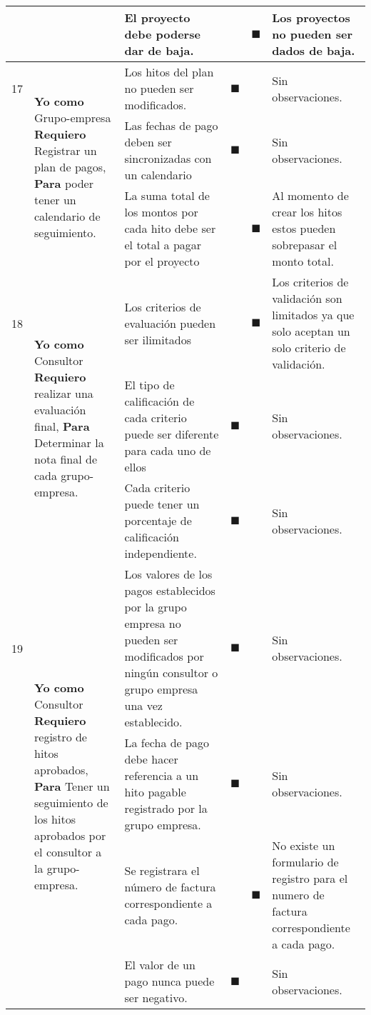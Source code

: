 \documentclass[letterpaper,11pt]{article}
\begin{document}
\begin{landscape}
\begin{tabular}{|c|p{5cm}|p{7.5cm}|c|c|p{7.5cm}|}
			& & El proyecto debe poderse dar de baja. & & $\blacksquare$ & Los proyectos no pueden ser dados de baja. \\ \hline
			17 & \multirow{3}{5cm}{\textbf{Yo como} Grupo-empresa \textbf{Requiero} Registrar un plan de pagos, \textbf{Para} poder tener un calendario de seguimiento.} & Los hitos del plan no pueden ser modificados. & $\blacksquare$ & & Sin observaciones. \\ \cline{3-6}
			& & Las fechas de pago deben ser sincronizadas con un calendario & $\blacksquare$ & & Sin observaciones. \\ \cline{3-6}
			& & La suma total de los montos por cada hito debe ser el total a pagar por el proyecto & & $\blacksquare$ & Al momento de crear los hitos estos pueden sobrepasar el monto total. \\ \hline
			18 & \multirow{3}{5cm}{\textbf{Yo como} Consultor \textbf{Requiero} realizar una evaluación final, \textbf{Para} Determinar la nota final de cada grupo-empresa.} & Los criterios de evaluación pueden ser ilimitados & & $\blacksquare$ & Los criterios de validación son limitados ya que solo aceptan un solo criterio de validación. \\ \cline{3-6}
			& & El tipo de calificación de cada criterio puede ser diferente para cada uno de ellos & $\blacksquare$ & & Sin observaciones. \\ \cline{3-6} 
			& & Cada criterio puede tener un porcentaje de calificación independiente. & $\blacksquare$ & & Sin observaciones. \\ \hline
			19 & \multirow{4}{5cm}{\textbf{Yo como} Consultor \textbf{Requiero} registro de hitos aprobados, \textbf{Para} Tener un seguimiento de los hitos aprobados por el consultor a la grupo-empresa.} & Los valores de los pagos establecidos por la grupo empresa no pueden ser modificados por ningún consultor o grupo empresa una vez establecido. & $\blacksquare$ & & Sin observaciones. \\ \cline{3-6} 
			& & La fecha de pago debe hacer referencia a un hito pagable registrado por la grupo empresa. & $\blacksquare$ & & Sin observaciones. \\ \cline{3-6} 
			& & Se registrara el número de factura correspondiente a cada pago. & & $\blacksquare$ & No existe un formulario de registro para  el numero de factura correspondiente a cada pago. \\ \cline{3-6} 
			& & El valor de un pago nunca puede ser negativo. & $\blacksquare$ & & Sin observaciones. \\ \hline 
		\end{tabular}
	\end{landscape}
\end{document}
